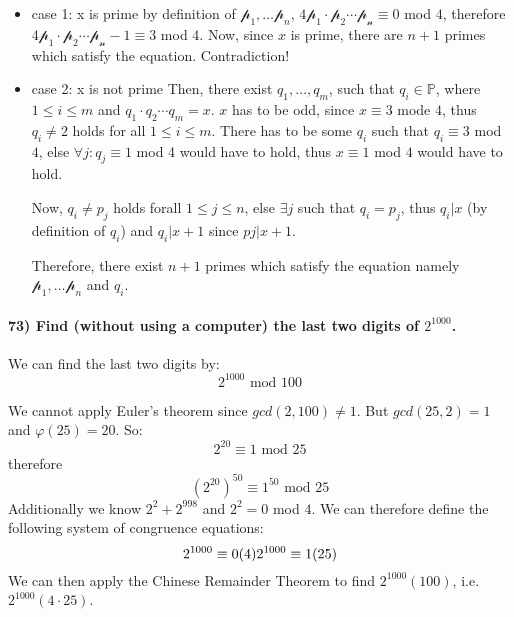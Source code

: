 \documentclass[
]{article}
\begin{document}
\begin{itemize}
\item
  case 1: x is prime by definition of
  \(\mathcal{p}_1, \dots \mathcal{p}_n\),
  \(4 \mathcal{p_1}\cdot \mathcal{p}_2 \cdots \mathcal{p_n} \equiv 0\)
  mod \(4\), therefore
  \(4 \mathcal{p_1}\cdot \mathcal{p}_2 \cdots \mathcal{p_n} -1 \equiv 3\)
  mod \(4\). Now, since \(x\) is prime, there are \(n+1\) primes which
  satisfy the equation. Contradiction!
\item
  case 2: x is not prime Then, there exist \(q_1, \dots , q_m\), such
  that \(q_i \in \mathbb{P}\), where \(1 \leq i \leq m\) and
  \(q_1 \cdot q_2 \cdots q_m = x\). \(x\) has to be odd, since
  \(x \equiv 3\) mode \(4\), thus \(q_i \neq 2\) holds for all
  \(1 \leq i \leq m\). There has to be some \(q_i\) such that
  \(q_i \equiv 3\) mod \(4\), else \(\forall j: q_j \equiv 1\) mod 4
  would have to hold, thus \(x \equiv 1\) mod \(4\) would have to hold.

  Now, \(q_i \neq p_j\) holds forall \(1 \leq j \leq n\), else
  \(\exists j\) such that \(q_i = p_j\), thus \(q_i |x\) (by definition
  of \(q_i\)) and \(q_i | x+1\) since \(pj | x+1\).

  Therefore, there exist \(n+1\) primes which satisfy the equation
  namely \(\mathcal{p}_1, \dots \mathcal{p}_n\) and \(q_i\).
\end{itemize}

\hypertarget{find-without-using-a-computer-the-last-two-digits-of-21000.}{%
\paragraph{\texorpdfstring{73) Find (without using a computer) the last
two digits of
\(2^{1000}\).}{73) Find (without using a computer) the last two digits of 2\^{}\{1000\}.}}\label{find-without-using-a-computer-the-last-two-digits-of-21000.}}

We can find the last two digits by: \[
2^{1000} \text{ mod } 100
\]

We cannot apply Euler's theorem since \(gcd(2,100) \neq 1\). But
\(gcd(25,2) = 1\) and \(\varphi(25) = 20\). So: \[
2^{20} \equiv 1 \text{ mod } 25
\] therefore \[
(2^{20})^{50} \equiv 1^{50} \text{ mod } 25
\] Additionally we know \(2^2 + 2^{998}\) and \(2^2 = 0\) mod \(4\). We
can therefore define the following system of congruence equations: \[
2^{1000} \equiv 0 (4) \\
2^{1000} \equiv 1 (25)
\] We can then apply the Chinese Remainder Theorem to find
\(2^{1000}(100)\), i.e.~\(2^{1000}(4 \cdot 25)\).
\end{document}
